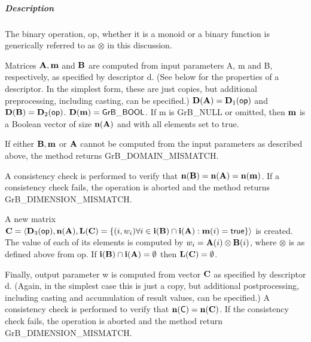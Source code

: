 \subparagraph{Description}


The binary operation, {\sf op}, whether it is a monoid or a binary function
is generically referred to as $\otimes$ in this discussion.

Matrices ${\bf A}, {\bf m}$ and ${\bf B}$ are computed from
input parameters {\sf A}, {\sf m} and {\sf B}, respectively, as specified
by descriptor {\sf d}. (See below for the properties of a descriptor. In
the simplest form, these are just copies, but additional preprocessing,
including casting, can be specified.)  $\bold{D}({\bf A}) =
\bold{D}_1({\sf op})$ and $\bold{D}({\bf B}) = \bold{D}_2({\sf op})$.
$\bold{D}({\bf m}) = {\sf GrB\_BOOL}$.  If {\sf m} is {\sf GrB\_NULL} or omitted,
then ${\bf m}$ is a Boolean vector of size $\bold{n}({\bf A})$
and with all elements set to {\sf true}.

If either ${\bf B}, {\bf m}$ or ${\bf A}$ cannot be computed
from the input parameters as described above, the method returns {\sf
	GrB\_DOMAIN\_MISMATCH}.

A consistency check is performed to verify that $\bold{n}({\bf B})
= \bold{n}({\bf A}) = \bold{n}({\bf m})$. If a consistency
check fails, the operation is aborted and the method returns {\sf
	GrB\_DIMENSION\_MISMATCH}.

A new matrix ${\bf C} = \langle \bold{D}_3({\sf op}),
\bold{n}({\bf A}), \bold{L}({\bf C}) = \{(i,w_i)  \forall i \in
{\bf i}({\bf B}) \cap {\bf i}({\bf A}) : {\bf m}(i)
= {\sf true} \} \rangle$ is created.  The value of each of its
elements is computed by $w_i = {\bf A}(i) \otimes {\bf B}(i)$,
where $\otimes$ is as defined above from {\sf op}.
If ${\bf i}({\bf B}) \cap {\bf i}({\bf A}) = \emptyset$
then $\bold{L}({\bf C}) = \emptyset$.

Finally, output parameter {\sf w} is computed from vector ${\bf C}$
as specified by descriptor {\sf d}. (Again, in the simplest case this
is just a copy, but additional postprocessing, including casting and
accumulation of result values, can be specified.)  A consistency check is
performed to verify that $\bold{n}({\sf C}) = \bold{n}({\bf C})$. If
the consistency check fails, the operation is aborted and the method
return {\sf GrB\_DIMENSION\_MISMATCH}.



